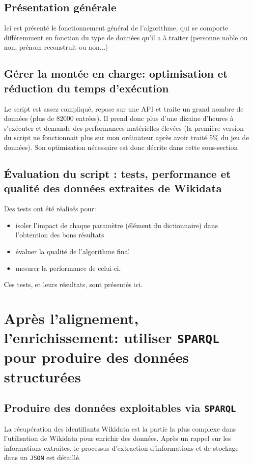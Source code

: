 \documentclass[a4paper, 12pt, twoside]{book}
\newcommand{\json}{\texttt{JSON}}
\newcommand{\sparql}{\texttt{SPARQL}}
\begin{document}
\subsection{Présentation générale}
Ici est présenté le fonctionnement général de l'algorithme, qui se comporte différemment en fonction du type de données qu'il a à traiter (personne noble ou non, prénom reconstruit ou non...)

\subsection{Gérer la montée en charge: optimisation et réduction du temps d'exécution}
Le script est assez compliqué, repose sur une API et traite un grand nombre de données (plus de 82000 entrées). Il prend donc plus d'une dizaine d'heures à s'exécuter et demande des performances matérielles élevées (la première version du script ne fonctionnait plus sur mon ordinateur après avoir traité 5\% du jeu de données). Son optimisation nécessaire est donc décrite dans cette sous-section

\subsection{Évaluation du script : tests, performance et qualité des données extraites de Wikidata}
Des tests ont été réalisés pour:
\begin{itemize}
	\item isoler l'impact de chaque paramètre (élément du dictionnaire) dans l'obtention des bons résultats
	\item évaluer la qualité de l'algorithme final
	\item mesurer la performance de celui-ci.
\end{itemize}
Ces tests, et leurs résultats, sont présentés ici.

\section{Après l'alignement, l'enrichissement: utiliser \sparql{} pour produire des données structurées}
\subsection{Produire des données exploitables via \sparql{}}
La récupération des identifiants Wikidata est la partie la plus complexe dans l'utilisation de Wikidata pour enrichir des données. Après un rappel sur les informations extraites, le processus d'extraction d'informations et de stockage dans un \json{} est détaillé.
\end{document}
